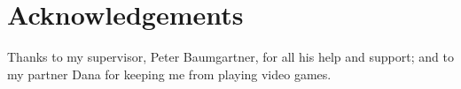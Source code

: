 
\chapter*{Acknowledgements}
\label{cha:ack}

Thanks to my supervisor, Peter Baumgartner, for all his help and support; and
to my partner Dana for keeping me from playing video games.


